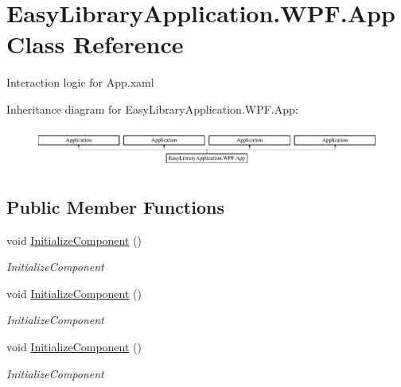 \hypertarget{class_easy_library_application_1_1_w_p_f_1_1_app}{}\section{Easy\+Library\+Application.\+W\+P\+F.\+App Class Reference}
\label{class_easy_library_application_1_1_w_p_f_1_1_app}


Interaction logic for App.\+xaml  


Inheritance diagram for Easy\+Library\+Application.\+W\+P\+F.\+App\+:\begin{figure}[H]
\begin{center}
\leavevmode
\includegraphics[height=1.333333cm]{class_easy_library_application_1_1_w_p_f_1_1_app}
\end{center}
\end{figure}
\subsection*{Public Member Functions}
\begin{DoxyCompactItemize}
\item 
void \mbox{\hyperlink{class_easy_library_application_1_1_w_p_f_1_1_app_a345468b068271f45134186bcbf118bce}{Initialize\+Component}} ()
\begin{DoxyCompactList}\small\item\em Initialize\+Component \end{DoxyCompactList}\item 
void \mbox{\hyperlink{class_easy_library_application_1_1_w_p_f_1_1_app_a345468b068271f45134186bcbf118bce}{Initialize\+Component}} ()
\begin{DoxyCompactList}\small\item\em Initialize\+Component \end{DoxyCompactList}\item 
void \mbox{\hyperlink{class_easy_library_application_1_1_w_p_f_1_1_app_a345468b068271f45134186bcbf118bce}{Initialize\+Component}} ()
\begin{DoxyCompactList}\small\item\em Initialize\+Component \end{DoxyCompactList}\end{DoxyCompactItemize}
